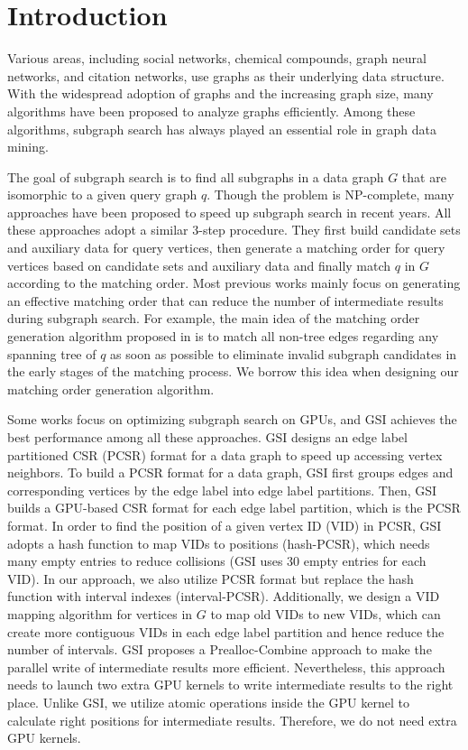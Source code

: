\section{Introduction}
Various areas, including social networks, chemical compounds, graph neural networks, and citation networks, use graphs as their underlying data structure. With the widespread adoption of graphs and the increasing graph size, many algorithms have been proposed to analyze graphs efficiently. Among these algorithms, subgraph search has always played an essential role in graph data mining.

The goal of subgraph search is to find all subgraphs in a data graph $G$ that are isomorphic to a given query graph $q$. Though the problem is NP-complete, many approaches  \cite{bhattarai2019ceci,guo2020gpu,tran2015fast,shi2020graphpi,bi2016efficient,zeng2020gsi,sun2020subgraph,guo2020exploiting,sun2020rapidmatch,lin2016network} have been proposed to speed up subgraph search in recent years. All these approaches adopt a similar 3-step procedure. They first build candidate sets and auxiliary data for query vertices, then generate a matching order for query vertices based on candidate sets and auxiliary data and finally match $q$ in $G$ according to the matching order. Most previous works mainly focus on generating an effective matching order that can reduce the number of intermediate results during subgraph search. For example, the main idea of the matching order generation algorithm proposed in \cite{bi2016efficient} is to match all non-tree edges regarding any spanning tree of $q$ as soon as possible to eliminate invalid subgraph candidates in the early stages of the matching process. We borrow this idea when designing our matching order generation algorithm.

Some works \cite{lin2016network,guo2020gpu,tran2015fast,zeng2020gsi,guo2020exploiting} focus on optimizing subgraph search on GPUs, and GSI \cite{zeng2020gsi} achieves the best performance among all these approaches. GSI designs an edge label partitioned CSR (PCSR) format for a data graph to speed up accessing vertex neighbors. To build a PCSR format for a data graph, GSI first groups edges and corresponding vertices by the edge label into edge label partitions. Then, GSI builds a GPU-based CSR format for each edge label partition, which is the PCSR format. In order to find the position of a given vertex ID (VID) in PCSR, GSI adopts a hash function to map VIDs to positions (hash-PCSR), which needs many empty entries to reduce collisions (GSI uses 30 empty entries for each VID). In our approach, we also utilize PCSR format but replace the hash function with interval indexes (interval-PCSR). Additionally, we design a VID mapping algorithm for vertices in $G$ to map old VIDs to new VIDs, which can create more contiguous VIDs in each edge label partition and hence reduce the number of intervals. GSI proposes a Prealloc-Combine approach to make the parallel write of intermediate results more efficient. Nevertheless, this approach needs to launch two extra GPU kernels to write intermediate results to the right place. Unlike GSI, we utilize atomic operations inside the GPU kernel to calculate right positions for intermediate results. Therefore, we do not need extra GPU kernels.

